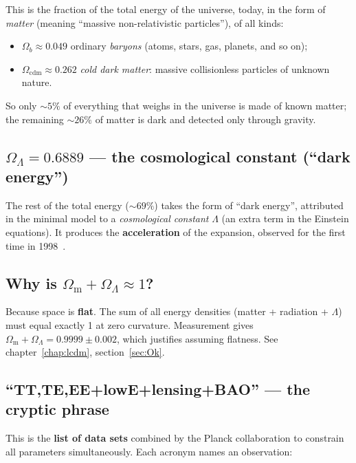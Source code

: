 \documentclass[11pt,a4paper,openany]{report}
\newcommand{\Om}{\Omega_{\mathrm{m}}}
\newcommand{\OL}{\Omega_{\Lambda}}
\begin{document}
This is the fraction of the total energy of the universe, today, in the form of
\emph{matter} (meaning “massive non-relativistic particles”), of all kinds:
\begin{itemize}[topsep=2pt]
\item $\Omega_b \approx 0.049$ ordinary \emph{baryons} (atoms, stars, gas,
  planets, and so on);
\item $\Omega_{\mathrm{cdm}} \approx 0.262$ \emph{cold dark matter}: massive
  collisionless particles of unknown nature.
\end{itemize}

So only $\sim 5\%$ of everything that weighs in the universe is made of known
matter; the remaining $\sim 26\%$ of matter is dark and detected only through
gravity.

\subsection{$\OL = 0.6889$ --- the cosmological constant (“dark energy”)}

The rest of the total energy ($\sim 69\%$) takes the form of “dark energy”,
attributed in the minimal model to a \emph{cosmological constant} $\Lambda$ (an
extra term in the Einstein equations). It produces the \textbf{acceleration} of
the expansion, observed for the first time in 1998~\cite{Riess1998,Perlmutter1999}.

\subsection{Why is $\Om + \OL \approx 1$?}

Because space is \textbf{flat}. The sum of all energy densities (matter +
radiation + $\Lambda$) must equal exactly 1 at zero curvature. Measurement
gives $\Om + \OL = 0.9999\pm 0.002$, which justifies assuming flatness. See
chapter~\ref{chap:lcdm}, section~\ref{sec:Ok}.

\subsection{“TT,TE,EE+lowE+lensing+BAO” --- the cryptic phrase}

This is the \textbf{list of data sets} combined by the Planck collaboration to
constrain all parameters simultaneously. Each acronym names an observation:
\end{document}
